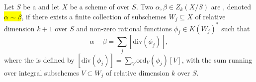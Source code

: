 \begin{definition} \label{definition:rationally_equivalent_k_dimensional_relative_algebraic_cycles_of_a_finite_type_scheme_over_a_noetherian_base}
Let $S$ be a  and let $X$ be a scheme of  over $S$. 
Two  $\alpha, \beta \in Z_k(X/S)$ are , denoted \hl{$\alpha \sim \beta$}, if there exists a finite collection of  subschemes $W_j \subseteq X$ of relative dimension $k+1$ over $S$ and non-zero rational functions $\phi_j \in K(W_j)^*$ such that 
\[ \alpha - \beta = \sum_j [\mathrm{div}(\phi_j)], \]
where the  is defined by $[\mathrm{div}(\phi_j)] = \sum_{V} \mathrm{ord}_V(\phi_j) [V]$, with the sum running over integral subschemes $V \subset W_j$ of relative dimension $k$ over $S$.
\end{definition}